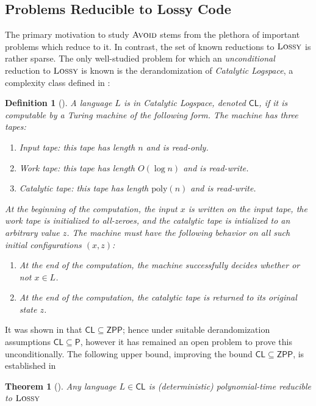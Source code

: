 \documentclass[11pt]{article}
\newtheorem{theorem}{Theorem}
\newtheorem{definition}{Definition}
\newcommand{\poly}{\mathrm{poly}}
\newcommand{\avoid}{\textsc{Avoid}}
\newcommand{\lossy}{\textsc{Lossy}}
\begin{document}
\subsection{Problems Reducible to Lossy Code}\label{sec:reductions-to-lossy}
The primary motivation to study $\avoid$ stems from the plethora of important problems which reduce to it. In contrast, the set of known reductions to $\lossy$ is rather sparse. The only well-studied problem for which an \emph{unconditional} reduction to $\lossy$ is known is the derandomization of \emph{Catalytic Logspace}, a complexity class defined in \cite{catalytic}:
\begin{definition}[\cite{catalytic}]
A language $L$ is in Catalytic Logspace, denoted $\mathsf{CL}$, if it is computable by a Turing machine of the following form. The machine has three tapes:
\begin{enumerate}
	\item Input tape: this tape has length $n$ and is read-only.
	\item Work tape: this tape has length $O(\log n)$ and is read-write.
	\item Catalytic tape: this tape has length $\poly(n)$ and is read-write.
\end{enumerate}
At the beginning of the computation, the input $x$ is written on the input tape, the work tape is initialized to all-zeroes, and the catalytic tape is intialized to an arbitrary value $z$. The machine must have the following behavior on all such initial configurations $(x,z)$:
\begin{enumerate}
	\item At the end of the computation, the machine successfully decides whether or not $x \in L$.
	\item At the end of the computation, the catalytic tape is returned to its original state $z$.
\end{enumerate}
\end{definition}
It was shown in \cite{catalytic} that $\mathsf{CL} \subseteq \mathsf{ZPP}$; hence under suitable derandomization assumptions $\mathsf{CL} \subseteq \mathsf{P}$, however it has remained an open problem to prove this unconditionally. The following upper bound, improving the bound $\mathsf{CL} \subseteq \mathsf{ZPP}$, is established in \cite{lossy-cl}
\begin{theorem}[\cite{lossy-cl}]
Any language $L \in \mathsf{CL}$ is (deterministic) polynomial-time reducible to $\lossy$
\end{theorem}
\end{document}
